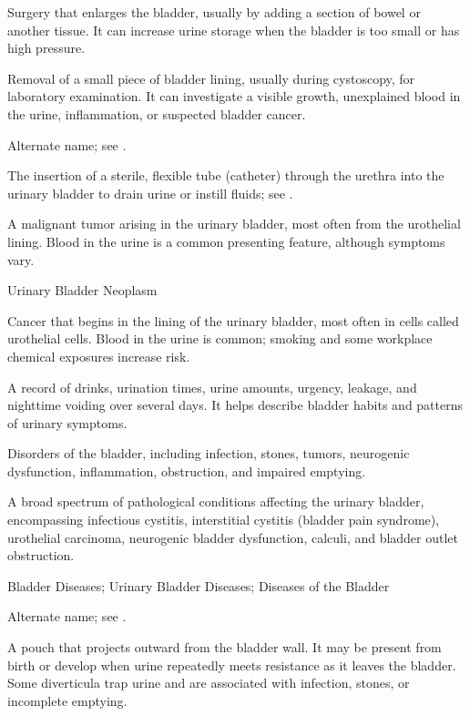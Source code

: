  Surgery that enlarges the bladder, usually by adding a section of bowel or another tissue. It can increase urine storage when the bladder is too small or has high pressure.

 Removal of a small piece of bladder lining, usually during cystoscopy, for laboratory examination. It can investigate a visible growth, unexplained blood in the urine, inflammation, or suspected bladder cancer.

 Alternate name; see .

 The insertion of a sterile, flexible tube (catheter) through the urethra into the urinary bladder to drain urine or instill fluids; see .

 A malignant tumor arising in the urinary bladder, most often from the urothelial lining. Blood in the urine is a common presenting
feature, although symptoms vary.

\synonyms
Urinary Bladder Neoplasm

 Cancer that begins in the lining of the urinary bladder, most often in cells called urothelial cells. Blood in the urine is common; smoking and some workplace chemical exposures increase risk.

 A record of drinks, urination times, urine amounts, urgency, leakage, and nighttime voiding over several days. It helps describe bladder habits and patterns of urinary symptoms.

 Disorders of the bladder, including infection, stones, tumors, neurogenic dysfunction, inflammation, obstruction, and impaired emptying.

 A broad spectrum of pathological conditions affecting the urinary bladder, encompassing infectious cystitis, interstitial cystitis (bladder pain syndrome), urothelial carcinoma, neurogenic bladder dysfunction, calculi, and bladder outlet obstruction.

\synonyms
Bladder Diseases; Urinary Bladder Diseases; Diseases of the Bladder

 Alternate name; see .

 A pouch that projects outward from the bladder
wall. It may be present from birth or develop when urine repeatedly meets
resistance as it leaves the bladder. Some diverticula trap urine and are
associated with infection, stones, or incomplete emptying.

